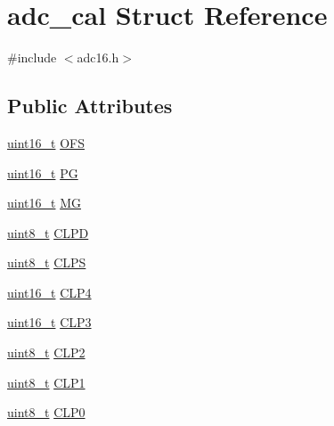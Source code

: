 \hypertarget{structadc__cal}{}\section{adc\+\_\+cal Struct Reference}
\label{structadc__cal}


{\ttfamily \#include $<$adc16.\+h$>$}

\subsection*{Public Attributes}
\begin{DoxyCompactItemize}
\item 
\hyperlink{_p_e___types_8h_a1f1825b69244eb3ad2c7165ddc99c956}{uint16\+\_\+t} \hyperlink{structadc__cal_ae4b1139e1b0ba3b8527c7385cac4412b}{O\+FS}
\item 
\hyperlink{_p_e___types_8h_a1f1825b69244eb3ad2c7165ddc99c956}{uint16\+\_\+t} \hyperlink{structadc__cal_a47b0863c244297eb0c8d295dad498501}{PG}
\item 
\hyperlink{_p_e___types_8h_a1f1825b69244eb3ad2c7165ddc99c956}{uint16\+\_\+t} \hyperlink{structadc__cal_a69dbfb243398e6737333fb0651f091c8}{MG}
\item 
\hyperlink{_p_e___types_8h_aba7bc1797add20fe3efdf37ced1182c5}{uint8\+\_\+t} \hyperlink{structadc__cal_abeb274b5807cc95e90cf4457a60610f5}{C\+L\+PD}
\item 
\hyperlink{_p_e___types_8h_aba7bc1797add20fe3efdf37ced1182c5}{uint8\+\_\+t} \hyperlink{structadc__cal_ae07b7f5635b68df7023bc27c5c22acc3}{C\+L\+PS}
\item 
\hyperlink{_p_e___types_8h_a1f1825b69244eb3ad2c7165ddc99c956}{uint16\+\_\+t} \hyperlink{structadc__cal_a9428123ce6dc17ba5d27e4694b610cc7}{C\+L\+P4}
\item 
\hyperlink{_p_e___types_8h_a1f1825b69244eb3ad2c7165ddc99c956}{uint16\+\_\+t} \hyperlink{structadc__cal_aa281ef46b94c67490ad5dab10422c05a}{C\+L\+P3}
\item 
\hyperlink{_p_e___types_8h_aba7bc1797add20fe3efdf37ced1182c5}{uint8\+\_\+t} \hyperlink{structadc__cal_a5e734a9dd14514080b7d2d950422da70}{C\+L\+P2}
\item 
\hyperlink{_p_e___types_8h_aba7bc1797add20fe3efdf37ced1182c5}{uint8\+\_\+t} \hyperlink{structadc__cal_ad52a0308d0dc3f19d0523ef68c7c6b8a}{C\+L\+P1}
\item 
\hyperlink{_p_e___types_8h_aba7bc1797add20fe3efdf37ced1182c5}{uint8\+\_\+t} \hyperlink{structadc__cal_a9087aa74023e0b4b1513a993739e12ac}{C\+L\+P0}
\item 

\end{DoxyCompactItemize}
